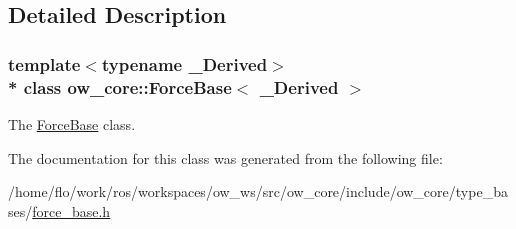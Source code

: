 \subsection{Detailed Description}
\subsubsection*{template$<$typename \+\_\+\+Derived$>$\\*
class ow\+\_\+core\+::\+Force\+Base$<$ \+\_\+\+Derived $>$}

The \hyperlink{classow__core_1_1ForceBase}{Force\+Base} class. 

The documentation for this class was generated from the following file\+:\begin{DoxyCompactItemize}
\item 
/home/flo/work/ros/workspaces/ow\+\_\+ws/src/ow\+\_\+core/include/ow\+\_\+core/type\+\_\+bases/\hyperlink{force__base_8h}{force\+\_\+base.\+h}\end{DoxyCompactItemize}
